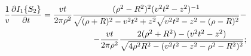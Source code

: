 %
%
\begin{equation} \begin{aligned} \label{eq:i1_partder}
\frac{1}{v} \frac{\partial  I_1 \{ S_2 \} }{\partial t} = \frac{ vt }{2 \pi \rho^2} 
\frac{ (\rho^2 - R^2)^2  (v^2 t^2 - z^2)^{-1} } 
{ \sqrt{ (\rho + R)^2 - v^2t^2 + z^2 } 
\sqrt{ v^2t^2 - z^2 - (\rho - R)^2 } } - \\
- \frac{vt}{2 \pi \rho^2} \frac{2 (\rho^2 + R^2) - (v^2 t^2 - z^2)}
{ \sqrt{4 \rho^2 R^2 - (v^2t^2 - z^2 - \rho^2 - R^2)^2} };
\end{aligned} \end{equation}
%
